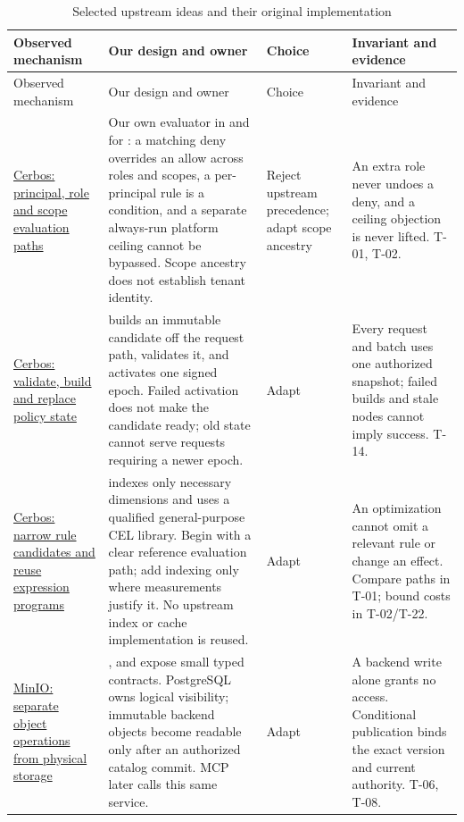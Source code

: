 \begin{longtable}{@{}P{0.21\textwidth}P{0.39\textwidth}P{0.10\textwidth}P{0.20\textwidth}@{}}
\caption{Selected upstream ideas and their original implementation}\label{tab:mechanisms}\\
\toprule Observed mechanism & Our design and owner & Choice & Invariant and evidence\\\midrule\endfirsthead
\toprule Observed mechanism & Our design and owner & Choice & Invariant and evidence\\\midrule\endhead
\href{https://github.com/cerbos/cerbos/blob/ae014ba2ea919771216bc666c4f654d18a1c1a52/internal/ruletable/check.go#L429}{Cerbos: principal, role and scope evaluation paths} & Our own evaluator in  and  for : a matching deny overrides an allow across roles and scopes, a per-principal rule is a condition, and a separate always-run platform ceiling cannot be bypassed. Scope ancestry does not establish tenant identity. & Reject upstream precedence; adapt scope ancestry & An extra role never undoes a deny, and a ceiling objection is never lifted. T-01, T-02.\\
\href{https://github.com/cerbos/cerbos/blob/ae014ba2ea919771216bc666c4f654d18a1c1a52/internal/ruletable/manager.go#L105}{Cerbos: validate, build and replace policy state} &  builds an immutable candidate off the request path, validates it, and activates one signed epoch. Failed activation does not make the candidate ready; old state cannot serve requests requiring a newer epoch. & Adapt & Every request and batch uses one authorized snapshot; failed builds and stale nodes cannot imply success. T-14.\\
\href{https://github.com/cerbos/cerbos/blob/ae014ba2ea919771216bc666c4f654d18a1c1a52/internal/ruletable/index/index.go#L56}{Cerbos: narrow rule candidates and reuse expression programs} &  indexes only necessary dimensions and uses a qualified general-purpose CEL library. Begin with a clear reference evaluation path; add indexing only where measurements justify it. No upstream index or cache implementation is reused. & Adapt & An optimization cannot omit a relevant rule or change an effect. Compare paths in T-01; bound costs in T-02/T-22.\\
\href{https://github.com/minio/minio/blob/7aac2a2c5b7c882e68c1ce017d8256be2feea27f/cmd/object-api-interface.go#L246}{MinIO: separate object operations from physical storage} & ,  and  expose small typed contracts. PostgreSQL owns logical visibility; immutable backend objects become readable only after an authorized catalog commit. MCP later calls this same service. & Adapt & A backend write alone grants no access. Conditional publication binds the exact version and current authority. T-06, T-08.\\

\end{longtable}
